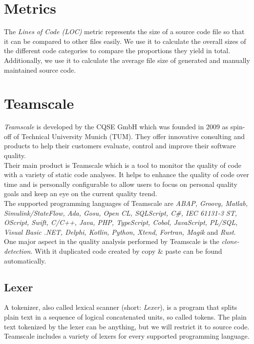 \section{Metrics}
The \textit{Lines of Code (LOC)} metric represents the size of a source code file so that it can be compared to other files easily. We use it to calculate the overall sizes of the different code categories to compare the proportions they yield in total. Additionally, we use it to calculate the average file size of generated and manually maintained source code.

\section{Teamscale}
\label{section:teamscale}
\textit{Teamscale} is developed by the CQSE GmbH which was founded in 2009 as spin-off of Technical University Munich (TUM). They offer innovative consulting and products to help their customers evaluate, control and improve their software quality.\\
Their main product is Teamscale which is a tool to monitor the quality of code with a variety of static code analyses. It helps to enhance the quality of code over time and is personally configurable to allow users to focus on personal quality goals and keep an eye on the current quality trend.\\
The supported programming languages of Teamscale are \textit{ABAP, Groovy, Matlab, Simulink/StateFlow, Ada, Gosu, Open CL, SQLScript, C\#, IEC 61131-3 ST, OScript, Swift, C/C++, Java, PHP, TypeScript, Cobol, JavaScript, PL/SQL, Visual Basic .NET, Delphi, Kotlin, Python, Xtend, Fortran, Magik} and \textit{Rust}.\\
One major aspect in the quality analysis performed by Teamscale is the \textit{clone-detection}. With it duplicated code created by copy \& paste can be found automatically.


\subsection{Lexer}
A tokenizer, also called lexical scanner (short: \textit{Lexer}), is a program that splits plain text in a sequence of logical concatenated units, so called tokens. The plain text tokenized by the lexer can be anything, but we will restrict it to source code. Teamscale includes a variety of lexers for every supported programming language. 

